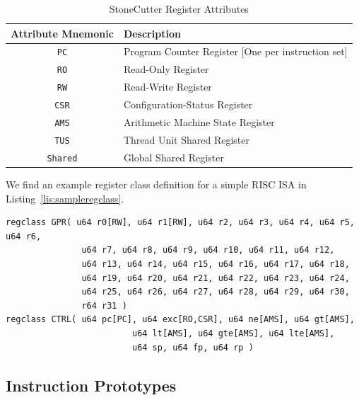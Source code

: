 \documentclass{article}
\begin{document}
\begin{table}[h]
\begin{center}
\caption{StoneCutter Register Attributes}
\vspace{0.125in}
\label{tab:regattrs}
\begin{tabular}{|c|l|}
\hline
\textbf{Attribute Mnemonic} & \textbf{Description}\\
\hline
\texttt{PC} & Program Counter Register [One per instruction set]\\
\hline
\texttt{RO} & Read-Only Register\\
\hline
\texttt{RW} & Read-Write Register\\
\hline
\texttt{CSR} & Configuration-Status Register\\
\hline
\texttt{AMS} & Arithmetic Machine State Register\\
\hline
\texttt{TUS} & Thread Unit Shared Register\\
\hline
\texttt{Shared} & Global Shared Register\\
\hline
\end{tabular}
\end{center}
\end{table}


We find an example register class definition for a simple RISC ISA in Listing~\ref{lis:sampleregclass}.  

\clearpage
\vspace{0.125in}
\begin{lstlisting}[frame=single,style=base,caption={Sample Register Class Definition},captionpos=b,label={lis:sampleregclass}]
regclass GPR( u64 r0[RW], u64 r1[RW], u64 r2, u64 r3, u64 r4, u64 r5, u64 r6, 
		       u64 r7, u64 r8, u64 r9, u64 r10, u64 r11, u64 r12, 
		       u64 r13, u64 r14, u64 r15, u64 r16, u64 r17, u64 r18,
		       u64 r19, u64 r20, u64 r21, u64 r22, u64 r23, u64 r24, 
		       u64 r25, u64 r26, u64 r27, u64 r28, u64 r29, u64 r30,
		       r64 r31 )
regclass CTRL( u64 pc[PC], u64 exc[RO,CSR], u64 ne[AMS], u64 gt[AMS],
                         u64 lt[AMS], u64 gte[AMS], u64 lte[AMS],
                         u64 sp, u64 fp, u64 rp )
\end{lstlisting}

\clearpage
\subsection{Instruction Prototypes}
\label{sec:InstructionPrototypes}
\end{document}
